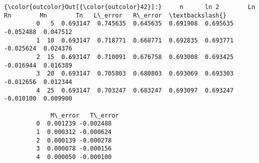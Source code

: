 \documentclass[11pt]{article}
\begin{document}
\begin{Verbatim}[commandchars=\\\{\}]
{\color{outcolor}Out[{\color{outcolor}42}]:}     n      ln 2        Ln        Rn        Mn        Tn   L\_error   R\_error  \textbackslash{}
         0   5  0.693147  0.745635  0.645635  0.691908  0.695635 -0.052488  0.047512   
         1  10  0.693147  0.718771  0.668771  0.692835  0.693771 -0.025624  0.024376   
         2  15  0.693147  0.710091  0.676758  0.693008  0.693425 -0.016944  0.016389   
         3  20  0.693147  0.705803  0.680803  0.693069  0.693303 -0.012656  0.012344   
         4  25  0.693147  0.703247  0.683247  0.693097  0.693247 -0.010100  0.009900   
         
             M\_error   T\_error  
         0  0.001239 -0.002488  
         1  0.000312 -0.000624  
         2  0.000139 -0.000278  
         3  0.000078 -0.000156  
         4  0.000050 -0.000100  
\end{Verbatim}
            
\end{document}
